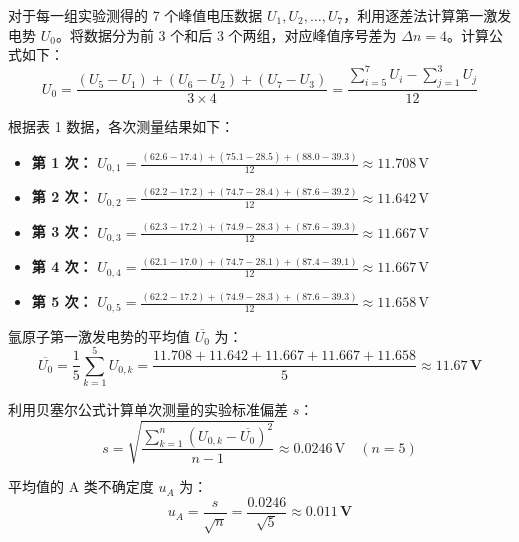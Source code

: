 \documentclass[10pt,a4paper]{ctexart}
\begin{document}
对于每一组实验测得的 7 个峰值电压数据 $U_1, U_2, \dots, U_7$，利用逐差法计算第一激发电势 $U_0$。将数据分为前 3 个和后 3 个两组，对应峰值序号差为 $\Delta n = 4$。计算公式如下：
\begin{equation*}
    U_0 = \frac{(U_5 - U_1) + (U_6 - U_2) + (U_7 - U_3)}{3 \times 4} = \frac{\sum_{i=5}^{7} U_i - \sum_{j=1}^{3} U_j}{12}
\end{equation*}

根据表 1 数据，各次测量结果如下：

\begin{itemize}
    \item \textbf{第 1 次：} 
    $U_{0,1} = \frac{(62.6-17.4) + (75.1-28.5) + (88.0-39.3)}{12} \approx 11.708 \, \text{V}$
    
    \item \textbf{第 2 次：} 
    $U_{0,2} = \frac{(62.2-17.2) + (74.7-28.4) + (87.6-39.2)}{12} \approx 11.642 \, \text{V}$
    
    \item \textbf{第 3 次：} 
    $U_{0,3} = \frac{(62.3-17.2) + (74.9-28.3) + (87.6-39.3)}{12} \approx 11.667 \, \text{V}$
    
    \item \textbf{第 4 次：} 
    $U_{0,4} = \frac{(62.1-17.0) + (74.7-28.1) + (87.4-39.1)}{12} \approx 11.667 \, \text{V}$
    
    \item \textbf{第 5 次：} 
    $U_{0,5} = \frac{(62.2-17.2) + (74.9-28.3) + (87.6-39.3)}{12} \approx 11.658 \, \text{V}$
\end{itemize}

氩原子第一激发电势的平均值 $\overline{U_0}$ 为：
\begin{equation*}
    \overline{U_0} = \frac{1}{5} \sum_{k=1}^{5} U_{0,k} = \frac{11.708 + 11.642 + 11.667 + 11.667 + 11.658}{5} \approx \mathbf{11.67 \, \text{V}}
\end{equation*}

利用贝塞尔公式计算单次测量的实验标准偏差 $s$：
\begin{equation*}
    s = \sqrt{\frac{\sum_{k=1}^{n} (U_{0,k} - \overline{U_0})^2}{n-1}} \approx 0.0246 \, \text{V} \quad (n=5)
\end{equation*}

平均值的 A 类不确定度 $u_A$ 为：
\begin{equation*}
    u_A = \frac{s}{\sqrt{n}} = \frac{0.0246}{\sqrt{5}} \approx \mathbf{0.011 \, \text{V}}
\end{equation*}
\end{document}
